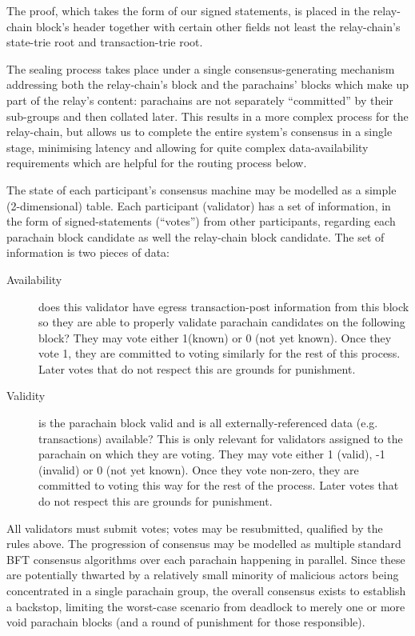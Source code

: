 \documentclass[9pt,oneside]{amsart}
\begin{document}
\begin{multicols}{2}
 The proof, which takes the form of our signed statements, is placed in the relay-chain block's header together with certain other fields not least the relay-chain's state-trie root and transaction-trie root.

 The sealing process takes place under a single consensus-generating mechanism addressing both the relay-chain's block and the parachains' blocks which make up part of the relay's content: parachains are not separately ``committed'' by their sub-groups and then collated later. This results in a more complex process for the relay-chain, but allows us to complete the entire system's consensus in a single stage, minimising latency and allowing for quite complex data-availability requirements which are helpful for the routing process below.

 The state of each participant's consensus machine may be modelled as a simple (2-dimensional) table. Each participant (validator) has a set of information, in the form of signed-statements (``votes'') from other participants, regarding each parachain block candidate as well the relay-chain block candidate. The set of information is two pieces of data:

\begin{description}
\item[Availability] does this validator have egress transaction-post information from this block so they are able to properly validate parachain candidates on the following block? They may vote either 1(known) or 0 (not yet known). Once they vote 1, they are committed to voting similarly for the rest of this process. Later votes that do not respect this are grounds for punishment.
\item[Validity] is the parachain block valid and is all externally-referenced data (e.g. transactions) available? This is only relevant for validators assigned to the parachain on which they are voting. They may vote either 1 (valid), -1 (invalid) or 0 (not yet known). Once they vote non-zero, they are committed to voting this way for the rest of the process. Later votes that do not respect this are grounds for punishment.
\end{description}

 All validators must submit votes; votes may be resubmitted, qualified by the rules above. The progression of consensus may be modelled as multiple standard BFT consensus algorithms over each parachain happening in parallel. Since these are potentially thwarted by a relatively small minority of malicious actors being concentrated in a single parachain group, the overall consensus exists to establish a backstop, limiting the worst-case scenario from deadlock to merely one or more void parachain blocks (and a round of punishment for those responsible).


\end{multicols}
\end{document}
